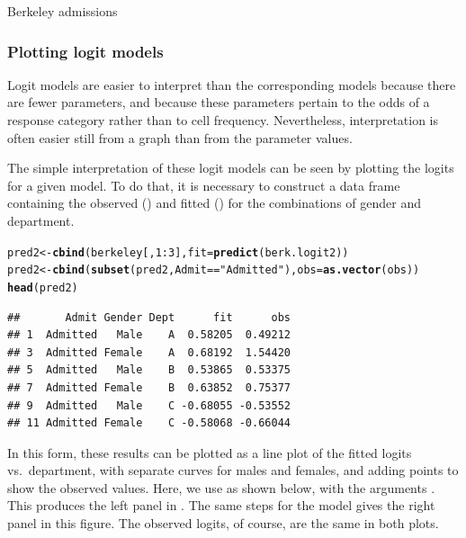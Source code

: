 \documentclass[11pt]{book}\usepackage[]{graphicx}\usepackage[]{color}
\makeatletter
\newcommand{\hlnum}[1]{\textcolor[rgb]{0.686,0.059,0.569}{#1}}%
\newcommand{\hlstr}[1]{\textcolor[rgb]{0.192,0.494,0.8}{#1}}%
\newcommand{\hlopt}[1]{\textcolor[rgb]{0,0,0}{#1}}%
\newcommand{\hlstd}[1]{\textcolor[rgb]{0.345,0.345,0.345}{#1}}%
\newcommand{\hlkwb}[1]{\textcolor[rgb]{0.69,0.353,0.396}{#1}}%
\newcommand{\hlkwc}[1]{\textcolor[rgb]{0.333,0.667,0.333}{#1}}%
\newcommand{\hlkwd}[1]{\textcolor[rgb]{0.737,0.353,0.396}{\textbf{#1}}}%
\newenvironment{kframe}{%
 \def\at@end@of@kframe{}%
 \ifinner\ifhmode%
  \def\at@end@of@kframe{\end{minipage}}%
  \begin{minipage}{\columnwidth}%
 \fi\fi%
 \def\FrameCommand##1{\hskip\@totalleftmargin \hskip-\fboxsep
 \colorbox{shadecolor}{##1}\hskip-\fboxsep
     \hskip-\linewidth \hskip-\@totalleftmargin \hskip\columnwidth}%
 \MakeFramed {\advance\hsize-\width
   \@totalleftmargin\z@ \linewidth\hsize
   \@setminipage}}%
 {\par\unskip\endMakeFramed%
 \at@end@of@kframe}
\newenvironment{knitrout}{}{} %
\renewenvironment{knitrout}{\small\renewcommand{\baselinestretch}{.85}}{} %
\makeatother
\begin{document}
\begin{Example}[berkeley7]{Berkeley admissions}
\subsubsection*{Plotting logit models}
Logit models are easier to interpret than the corresponding \loglin
models because there are fewer parameters,
and because these parameters pertain to the odds of a response category
rather than to cell frequency.
Nevertheless, interpretation is often easier still from a graph than from the
parameter values.

The simple interpretation of these logit models can be seen by plotting the
logits for a given model.
To do that, it is necessary to construct a data frame
containing the observed () and fitted () for the
combinations of gender and department.
\begin{knitrout}
\color{fgcolor}\begin{kframe}
\begin{alltt}
\hlstd{pred2} \hlkwb{<-} \hlkwd{cbind}\hlstd{(berkeley[,}\hlnum{1}\hlopt{:}\hlnum{3}\hlstd{],} \hlkwc{fit}\hlstd{=}\hlkwd{predict}\hlstd{(berk.logit2))}
\hlstd{pred2} \hlkwb{<-} \hlkwd{cbind}\hlstd{(}\hlkwd{subset}\hlstd{(pred2, Admit}\hlopt{==}\hlstr{"Admitted"}\hlstd{),} \hlkwc{obs}\hlstd{=}\hlkwd{as.vector}\hlstd{(obs))}
\hlkwd{head}\hlstd{(pred2)}
\end{alltt}
\begin{verbatim}
##       Admit Gender Dept      fit      obs
## 1  Admitted   Male    A  0.58205  0.49212
## 3  Admitted Female    A  0.68192  1.54420
## 5  Admitted   Male    B  0.53865  0.53375
## 7  Admitted Female    B  0.63852  0.75377
## 9  Admitted   Male    C -0.68055 -0.53552
## 11 Admitted Female    C -0.58068 -0.66044
\end{verbatim}
\end{kframe}
\end{knitrout}

In this form, these results can be plotted as a line plot of the
fitted logits vs.\ department, with separate curves for males
and females, and adding points to show the observed values.
Here, we use  as shown below, with
the  arguments .
This produces the left panel in .
The same steps for the model 
gives the right panel in this figure.
The observed logits, of course, are the same in both plots.


\end{Example}
\end{document}
